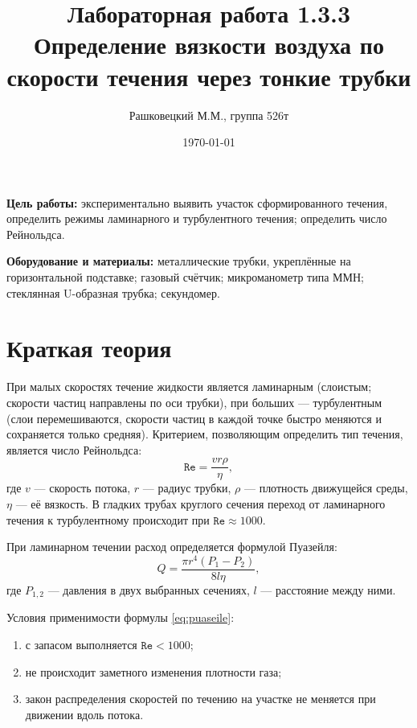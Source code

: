 \documentclass[12pt]{article}
\author{Рашковецкий М.М., группа 526т}
\date{\today}
\title{Лабораторная работа 1.3.3\\Определение вязкости воздуха по скорости течения через тонкие трубки}
\begin{document}
	\maketitle
	
	{\parindent=1cm \hangindent=1cm \parskip=0.5cm
	{\bfseries Цель работы:} экспериментально выявить участок сформированного течения, определить режимы ламинарного и турбулентного течения; определить число Рейнольдса.
	
	\hangindent=1cm
	{\bfseries Оборудование и материалы:} металлические трубки, укреплённые на горизонтальной подставке; газовый счётчик; микроманометр типа ММН; стеклянная U-образная трубка; секундомер.\par}
	
	\section*{Краткая теория}
	
	При малых скоростях течение жидкости является ламинарным (слоистым; скорости частиц направлены по оси трубки), при больших --- турбулентным (слои перемешиваются, скорости частиц в каждой точке быстро меняются и сохраняется только средняя). Критерием, позволяющим определить тип течения, является число Рейнольдса:
	\begin{equation}
	\label{eq:Re}
	\texttt{Re} = \frac{vr \rho}{\eta},
	\end{equation}
	где $v$ --- скорость потока, $r$ --- радиус трубки, $\rho$ --- плотность движущейся среды, $\eta$ --- её вязкость. В гладких трубах круглого сечения переход от ламинарного течения к турбулентному происходит при $\texttt{Re} \approx 1000$.
	
	При ламинарном течении расход определяется формулой Пуазейля:
	\begin{equation}
	\label{eq:puaseile}
	Q=\frac{\pi r^4 \left( P_1 - P_2 \right)}{8l \eta},
	\end{equation}
	где $P_{1,2}$ --- давления в двух выбранных сечениях, $l$ --- расстояние между ними.
	
	Условия применимости формулы \eqref{eq:puaseile}:
	\begin{enumerate}
		\item с запасом выполняется $\texttt{Re} < 1000$;
		\item не происходит заметного изменения плотности газа;
		\item закон распределения скоростей по течению на участке не меняется при движении вдоль потока.
	\end{enumerate}
	
\end{document}
